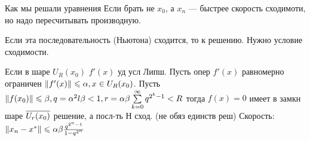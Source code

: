 Как мы решали уравнения
Если брать не $x_0$, а $x_n$ --- быстрее скорость сходимоти, но надо пересчитывать производную.

Если эта последовательность (Ньютона) сходится, то к решению. Нужно условие сходимости.

\theorem{} Если в шаре $U_R(x_0)$ $f'(x)$ уд усл Липш. Пусть опер $f'(x)$ равномерно ограничен $\left\|{f'(x)}\right\|\leqslant \alpha, x\in U_R(x_0)$. Пусть $\left\|{f(x_0)}\right\|\leqslant \beta, q = \alpha^2l\beta < 1, r = \alpha\beta\sum\limits_{k=0}^{\infty}q^{2^k-1} < R$
тогда $f(x) = 0$ имеет в замкн шаре $\overline{U_r(x_0)}$ решение, а посл-ть Н сход. (не обяз единств реш)
Скорость: $\left\|{x_n-x^*}\right\| \leqslant \alpha\beta\frac{q^{2^n-1}}{1-q^{2^n}}$